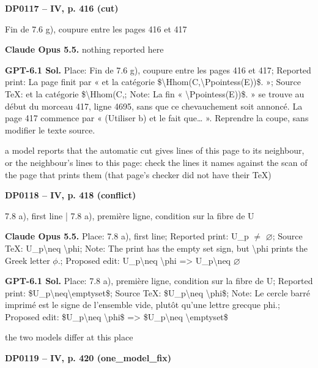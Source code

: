 \par\noindent\hypertarget{DP0117}{}\textbf{DP0117 -- IV, p. 416 (cut)}\par
Fin de 7.6 g), coupure entre les pages 416 et 417\par
\textbf{Claude Opus 5.5.} nothing reported here\par
\textbf{GPT-6.1 Sol.} Place: Fin de 7.6 g), coupure entre les pages 416 et 417; Reported print: La page finit par « et la catégorie \$\textbackslash{}Hhom(C,\textbackslash{}Ppointess(E))\$. »; Source TeX: et la catégorie \$\textbackslash{}Hhom(C,; Note: La fin « \textbackslash{}Ppointess(E))\$. » se trouve au début du morceau 417, ligne 4695, sans que ce chevauchement soit annoncé. La page 417 commence par « (Utiliser b) et le fait que… ». Reprendre la coupe, sans modifier le texte source.\par
a model reports that the automatic cut gives lines of this page to its neighbour, or the neighbour's lines to this page: check the lines it names against the scan of the page that prints them (that page's checker did not have their TeX)\par
\par\noindent\hypertarget{DP0118}{}\textbf{DP0118 -- IV, p. 418 (conflict)}\par
7.8 a), first line | 7.8 a), première ligne, condition sur la fibre de U\par
\textbf{Claude Opus 5.5.} Place: 7.8 a), first line; Reported print: U\_p \ensuremath{\ne} \ensuremath{\varnothing}; Source TeX: U\_p\textbackslash{}neq \textbackslash{}phi; Note: The print has the empty set sign, but \textbackslash{}phi prints the Greek letter \ensuremath{\phi}.; Proposed edit: U\_p\textbackslash{}neq \textbackslash{}phi =\allowbreak > U\_p\textbackslash{}neq \ensuremath{\varnothing}\par
\textbf{GPT-6.1 Sol.} Place: 7.8 a), première ligne, condition sur la fibre de U; Reported print: \$U\_p\textbackslash{}neq\textbackslash{}emptyset\$; Source TeX: \$U\_p\textbackslash{}neq \textbackslash{}phi\$; Note: Le cercle barré imprimé est le signe de l'ensemble vide, plutôt qu'une lettre grecque phi.; Proposed edit: \$U\_p\textbackslash{}neq \textbackslash{}phi\$ =\allowbreak > \$U\_p\textbackslash{}neq \textbackslash{}emptyset\$\par
the two models differ at this place\par
\par\noindent\hypertarget{DP0119}{}\textbf{DP0119 -- IV, p. 420 (one\_model\_fix)}\par
